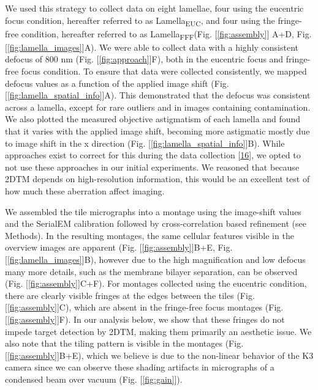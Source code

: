 \documentclass[
]{article}
\begin{document}
We used this strategy to collect data on eight lamellae, four using the
eucentric focus condition, hereafter referred to as Lamella\textsubscript{EUC}, and
four using the fringe-free condition, hereafter referred to as
Lamella\textsubscript{FFF}(Fig. {[}\ref{fig:assembly}{]} A+D, Fig. {[}\ref{fig:lamella_images}{]}A). We
were able to collect data with a highly consistent defocus of 800 nm
(Fig. {[}\ref{fig:approach}{]}F), both in the eucentric focus and fringe-free
focus condition. To ensure that data were collected consistently, we
mapped defocus values as a function of the applied image shift (Fig.
{[}\ref{fig:lamella_spatial_info}{]}A). This demonstrated that the defocus was
consistent across a lamella, except for rare outliers and in images
containing contamination. We also plotted the measured objective
astigmatism of each lamella and found that it varies with the applied
image shift, becoming more astigmatic mostly due to image shift in the x
direction (Fig. {[}\ref{fig:lamella_spatial_info}{]}B). While approaches exist to
correct for this during the data collection
{[}\protect\hyperlink{ref-APSL9LmU}{16}{]}, we opted to not use these approaches
in our initial experiments. We reasoned that because 2DTM depends on
high-resolution information, this would be an excellent test of how much
these aberration affect imaging.

We assembled the tile micrographs into a montage using the image-shift
values and the SerialEM calibration followed by cross-correlation based
refinement (see Methods). In the resulting montages, the same cellular
features visible in the overview images are apparent (Fig.
{[}\ref{fig:assembly}{]}B+E, Fig. {[}\ref{fig:lamella_images}{]}B), however due to the
high magnification and low defocus many more details, such as the
membrane bilayer separation, can be observed (Fig. {[}\ref{fig:assembly}{]}C+F).
For montages collected using the eucentric condition, there are clearly
visible fringes at the edges between the tiles (Fig. {[}\ref{fig:assembly}{]}C),
which are absent in the fringe-free focus montages (Fig.
{[}\ref{fig:assembly}{]}F). In our analysis below, we show that these fringes do
not impede target detection by 2DTM, making them primarily an aesthetic
issue. We also note that the tiling pattern is visible in the montages
(Fig. {[}\ref{fig:assembly}{]}B+E), which we believe is due to the non-linear
behavior of the K3 camera since we can observe these shading artifacts
in micrographs of a condensed beam over vacuum (Fig. {[}\ref{fig:gain}{]}).
\end{document}
